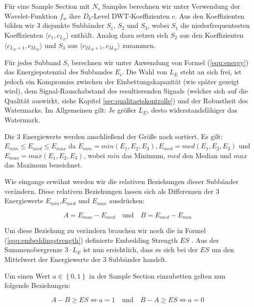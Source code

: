 Für eine Sample Section mit ${N}_{s}$  Samples berechnen wir unter Verwendung der Wavelet-Funktion ${f}_{w}$ ihre ${D}_{k}$-Level DWT-Koeffizienten $c$. Aus den Koeffizienten bilden wir 3 disjunkte Subbänder ${S}_{1}$, ${S}_{2}$ und ${S}_{3}$, wobei ${S}_{1}$ die niederfrequentesten Koeffizienten $\langle{c}_{1},{c}_{{L}_{E}}\rangle$ enthält. Analog dazu setzen sich ${S}_{2}$ aus den Koeffizienten $\langle{c}_{{L}_{E}+1},{c}_{2{L}_{E}}\rangle$ und ${S}_{3}$ aus $\langle{c}_{2{L}_{E}+1},{c}_{3{L}_{E}}\rangle$ zusammen. 

Für jedes Subband ${S}_{i}$ berechnen wir unter Anwendung von Formel (\ref{equ:energy}) das Energiepotenzial des Subbandes ${E}_{i}$. Die Wahl von ${L}_{E}$ steht an sich frei, ist jedoch ein Kompromiss zwischen der Einbettungskapazität (wie später gezeigt wird), dem Signal-Rauschabstand des resultierenden Signals (welcher sich auf die Qualität auswirkt\cite{xiang2007robust}, siehe Kapitel \ref{sec:qualitaetskontrolle}) und der Robustheit des Watermarks. Im Allgemeinen gilt: Je größer ${L}_{E}$, desto widerstandsfähiger das Watermark.

Die 3 Energiewerte werden anschließend der Größe nach sortiert. Es gilt: ${E}_{min}\leq{E}_{med}\leq{E}_{max}$ da ${E}_{min}=min({E}_{1}, {E}_{2}, {E}_{3}), {E}_{med}=med({E}_{1}, {E}_{2}, {E}_{3})$ und ${E}_{max}=max({E}_{1}, {E}_{2}, {E}_{3})$, wobei $min$ das Minimum, $med$ den Median und $max$ das Maximum bezeichnet. 

Wie eingangs erwähnt werden wir die relativen Beziehungen dieser Subbänder verändern. Diese relativen Beziehungen lassen sich als Differenzen der 3 Energiewerte ${E}_{min}$,${E}_{med}$ und ${E}_{max}$ ausdrücken:

	 \begin{equation}
		 A = {E}_{max}-{E}_{med} \quad\mbox{und}\quad B = {E}_{med}-{E}_{min} \label{equ:energydifferences}
	 \end{equation}

Um diese Beziehung zu verändern brauchen wir noch die in Formel (\ref{equ:embeddingstrength}) definierte Embedding Strength $ES$ . Aus der Summenobergrenze $3 \cdot {L}_{E}$ ist nun ersichtlich, dass es sich bei der $ES$ um den Mittelwert der Energiewerte der 3 Subbänder handelt.

Um einen Wert $a \in\left\{0,1\right\}$ in der Sample Section einzubetten gelten nun folgende Beziehungen:

	 \begin{equation}
		 A - B \geq ES \iff a = 1 \quad\mbox{und}\quad B - A \geq ES \iff a = 0 \label{equ:embeddingrelationships}
	 \end{equation}
	 
